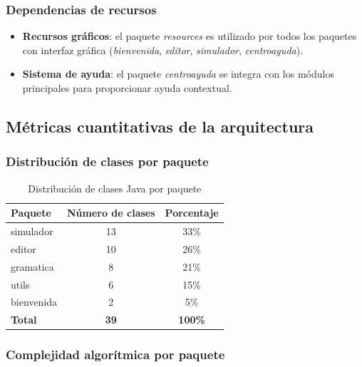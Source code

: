 \subsubsection{Dependencias de recursos}

\begin{itemize}
    \item \textbf{Recursos gráficos}: el paquete \textit{resources} es utilizado por todos los paquetes con interfaz gráfica (\textit{bienvenida}, \textit{editor}, \textit{simulador}, \textit{centroayuda}).

    \item \textbf{Sistema de ayuda}: el paquete \textit{centroayuda} se integra con los módulos principales para proporcionar ayuda contextual.
\end{itemize}

\subsection{Métricas cuantitativas de la arquitectura}

\subsubsection{Distribución de clases por paquete}

\begin{table}[H]
\centering
\caption{Distribución de clases Java por paquete}
\label{tab:distribucion-clases}
\begin{tabular}{|l|c|c|}
\hline
\textbf{Paquete} & \textbf{Número de clases} & \textbf{Porcentaje} \\
\hline
simulador & 13 & 33\% \\
editor & 10 & 26\% \\
gramatica & 8 & 21\% \\
utils & 6 & 15\% \\
bienvenida & 2 & 5\% \\
\hline
\textbf{Total} & \textbf{39} & \textbf{100\%} \\
\hline
\end{tabular}
\end{table}

\subsubsection{Complejidad algorítmica por paquete}

